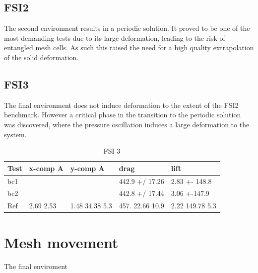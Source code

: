 \subsection{FSI2}
The second environment results in a periodic solution. It proved to be one of the most demanding tests due to its large deformation, leading to the risk of entangled mesh cells. As such this raised the need for a high quality extrapolation of the solid deformation.
\\
\subsection{FSI3}    
The final environment does not induce deformation to the extent of the FSI2 benchmark. However a critical phase in the transition to the periodic solution was discovered, where the pressure oscillation induces a large deformation to the system. 

\begin{table}[]
\centering
\caption{FSI 3}
\label{my-label}
\begin{tabular}{lllll}
 \hline
Test & x-comp A          & y-comp A             & drag                   & lift                 \\
 \hline
bc1 &                   &                      & 442.9 +/ 17.26         & 2.83 +- 148.8        \\
 \hline
bc2 &                   &                      & 442.8 +/ 17.44         & 3.06 +-147.9         \\
 \hline
Ref & 2.69  2.53  &   1.48  34.38 5.3   & 457. 22.66 10.9 & 2.22 149.78 5.3 \\
 \hline
\end{tabular}
\end{table}


\section{Mesh movement}
The final enviroment 